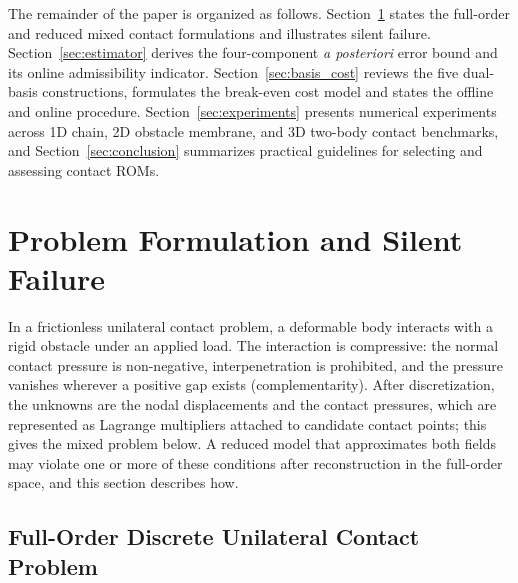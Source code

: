 \documentclass[11pt,a4paper]{article}
\begin{document}
The remainder of the paper is organized as follows. Section~\ref{sec:formulation} states the full-order and reduced mixed contact formulations and illustrates silent failure. Section~\ref{sec:estimator} derives the four-component \emph{a posteriori} error bound and its online admissibility indicator. Section~\ref{sec:basis_cost} reviews the five dual-basis constructions, formulates the break-even cost model and states the offline and online procedure. Section~\ref{sec:experiments} presents numerical experiments across 1D chain, 2D obstacle membrane, and 3D two-body contact benchmarks, and Section~\ref{sec:conclusion} summarizes practical guidelines for selecting and assessing contact ROMs.

\section{Problem Formulation and Silent Failure}
\label{sec:formulation}

In a frictionless unilateral contact problem, a deformable body interacts with a rigid obstacle under an applied load. The interaction is compressive: the normal contact pressure is non-negative, interpenetration is prohibited, and the pressure vanishes wherever a positive gap exists (complementarity). After discretization, the unknowns are the nodal displacements and the contact pressures, which are represented as Lagrange multipliers attached to candidate contact points; this gives the mixed problem below. A reduced model that approximates both fields may violate one or more of these conditions after reconstruction in the full-order space, and this section describes how.

\hypertarget{full-order-discrete-unilateral-contact-problem}{%
\subsection{Full-Order Discrete Unilateral Contact Problem}\label{full-order-discrete-unilateral-contact-problem}}
\end{document}
